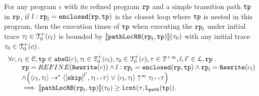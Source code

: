 \begin{lemma}
  For any program $c$ with its refined program $\mathtt{rp}$ and a simple transition path $\mathtt{tp}$ in $\mathtt{rp}$,
  if $l: \mathtt{rp}_l = \mathtt{enclosed}(\mathtt{rp}, \mathtt{tp})$ is the closest loop where $\mathtt{tp}$ is nested in this program,
  then the execution times of $\mathtt{tp}$ when executing the $\mathtt{rp}_l$ under initial trace $\mathtt{\tau}_l \in \mathcal{T}^{+}_0(c_l)$ is bounded by $\llbracket \mathtt{pathLocRB}(\mathtt{rp}_l, \mathtt{tp}) \rrbracket(\mathtt{\tau}_0)$ with any initial trace $\mathtt{\tau}_0 \in \mathcal{T}^{+}_0(c)$.
  \[
    \begin{array}{l}
    \forall c, c_l \in \cdom, \tpath \in \absG(c), 
    \trace_l \in \ftdom_0(c_l), \trace_0 \in \ftdom_0(c), \trace \in \tdom, l, l' \in \ldom, \rprog \st 
    \\ \qquad
    \rprog = REFINE(\algrewrite(c))
    \land
    l: \rprog_l = \kw{enclosed}(\rprog, \tpath)
    \land 
    \rprog_l = \algrewrite(c_l)
    \\ \qquad
    \land
    \Big(
    \config{c_l, \trace_l} \rightarrow^* \config{\clabel{\eskip}^{l'}, \trace_l \tracecat \trace}
    \lor \config{c_l, \trace_l} \uparrow^{\infty} \trace_l \tracecat \trace 
    \Big)
    \\ \qquad
    \implies
    \econfig{\outinB(\rprog_l, \tpath)}(\trace_0) \geq \lcounter(\trace, \pathl(\tpath)).
    \end{array}
  \]  
\end{lemma}

